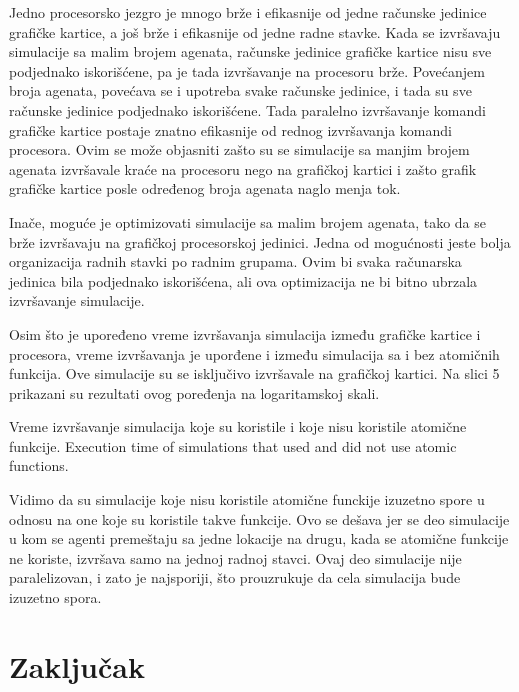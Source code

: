 Jedno procesorsko jezgro je mnogo brže i efikasnije od jedne računske jedinice grafičke kartice, a još brže i efikasnije od jedne radne stavke. Kada se izvršavaju simulacije sa malim brojem agenata, računske jedinice grafičke kartice nisu sve podjednako iskorišćene, pa je tada izvršavanje na procesoru brže. Povećanjem broja agenata, povećava se i upotreba svake računske jedinice, i tada su sve računske jedinice podjednako iskorišćene. Tada paralelno izvršavanje komandi grafičke kartice postaje znatno efikasnije od rednog izvršavanja komandi procesora. Ovim se može objasniti zašto su se simulacije sa manjim brojem agenata izvršavale kraće na procesoru nego na grafičkoj kartici i zašto grafik grafičke kartice posle određenog broja agenata naglo menja tok.

Inače, moguće je optimizovati simulacije sa malim brojem agenata, tako da se brže izvršavaju na grafičkoj procesorskoj jedinici. Jedna od mogućnosti jeste bolja organizacija radnih stavki po radnim grupama. Ovim bi svaka računarska jedinica bila podjednako iskorišćena, ali ova optimizacija ne bi bitno ubrzala izvršavanje simulacije.

Osim što je upoređeno vreme izvršavanja simulacija između grafičke kartice i procesora, vreme izvršavanja je uporđene i između simulacija sa i bez atomičnih funkcija. Ove simulacije su se isključivo izvršavale na grafičkoj kartici. Na slici 5 prikazani su rezultati ovog poređenja na logaritamskoj skali.

    {Vreme izvršavanje simulacija koje su koristile i koje nisu koristile atomične funkcije.}
    {Execution time of simulations that used and did not use atomic functions.}

Vidimo da su simulacije koje nisu koristile atomične funckije izuzetno spore u odnosu na one koje su koristile takve funkcije. Ovo se dešava jer se deo simulacije u kom se agenti premeštaju sa jedne lokacije na drugu, kada se atomične funkcije ne koriste, izvršava samo na jednoj radnoj stavci. Ovaj deo simulacije nije paralelizovan, i zato je najsporiji, što prouzrukuje da cela simulacija bude izuzetno spora.

\section{Zaključak}


